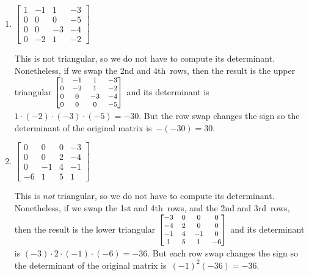 \begin{example}
\begin{enumerate}
\item \(\begin{bmatrix}1&-1&1&-3
\\0&0&0&-5
\\0&0&-3&-4
\\0&-2&1&-2\end{bmatrix}\)
\begin{solution} 
This is not triangular, so we do not have to compute its determinant. 
Nonetheless, if we swap the 2nd and 4th~rows, then the result is the upper triangular \(\footnotesize\begin{bmatrix}1&-1&1&-3
\\0&-2&1&-2
\\0&0&-3&-4
\\0&0&0&-5\end{bmatrix}\) and its determinant is \(1\cdot(-2)\cdot(-3)\cdot(-5)=-30\). 
But the row swap changes the sign so the determinant of the original matrix is~\(-(-30)=30\).
\end{solution}

\item \(\begin{bmatrix}0&0&0&-3
\\0&0&2&-4
\\0&-1&4&-1
\\-6&1&5&1\end{bmatrix}\)
\begin{solution} 
This is \emph{not} triangular, so we do not have to compute its determinant. 
Nonetheless, if we swap the 1st and 4th~rows, and the 2nd and 3rd~rows, then the result is the lower triangular \(\footnotesize\begin{bmatrix}-3&0&0&0
\\-4&2&0&0
\\-1&4&-1&0
\\1&5&1&-6\end{bmatrix}\) and its determinant is \((-3)\cdot2\cdot(-1)\cdot(-6)=-36\). 
But each row swap changes the sign so the determinant of the original matrix is~\((-1)^2(-36)=-36\). 
\end{solution}


\end{enumerate}
\end{example}
